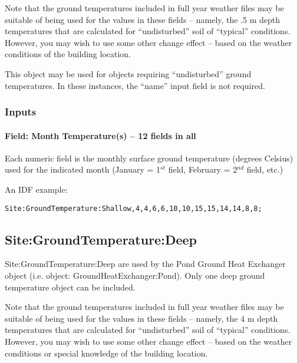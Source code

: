 \begin{callout}
Note that the ground temperatures included in full year weather files may be suitable of being used for the values in these fields -- namely, the .5 m depth temperatures that are calculated for ``undisturbed'' soil of ``typical'' conditions. However, you may wish to use some other change effect -- based on the weather conditions of the building location.
\end{callout}

This object may be used for objects requiring ``undisturbed'' ground temperatures. In these instances, the ``name'' input field is not required.

\subsubsection{Inputs}\label{inputs-12-008}

\paragraph{Field: Month Temperature(s) -- 12 fields in all}\label{field-month-temperatures-12-fields-in-all-1}

Each numeric field is the monthly surface ground temperature (degrees Celsius) used for the indicated month (January = 1\(^{st}\) field, February = 2\(^{nd}\) field, etc.)

An IDF example:

\begin{lstlisting}
Site:GroundTemperature:Shallow,4,4,6,6,10,10,15,15,14,14,8,8;
\end{lstlisting}

\subsection{Site:GroundTemperature:Deep}\label{sitegroundtemperaturedeep}

Site:GroundTemperature:Deep are used by the Pond Ground Heat Exchanger object (i.e. object: GroundHeatExchanger:Pond). Only one deep ground temperature object can be included.

\begin{callout}
Note that the ground temperatures included in full year weather files may be suitable of being used for the values in these fields -- namely, the 4 m depth temperatures that are calculated for ``undisturbed'' soil of ``typical'' conditions. However, you may wish to use some other change effect -- based on the weather conditions or special knowledge of the building location.
\end{callout}

